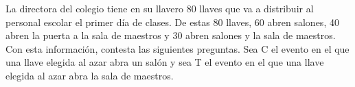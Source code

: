 \question[20] La directora del colegio tiene en su llavero 80 llaves que va a distribuir al personal escolar
el primer día de clases. De estas 80 llaves, 60 abren salones, 40 abren la puerta a la sala de maestros y
30 abren salones y la sala de maestros. Con esta información, contesta las siguientes preguntas.
Sea C el evento en el que una llave elegida al azar abra un salón y sea T el evento en el que una
llave elegida al azar abra la sala de maestros.
